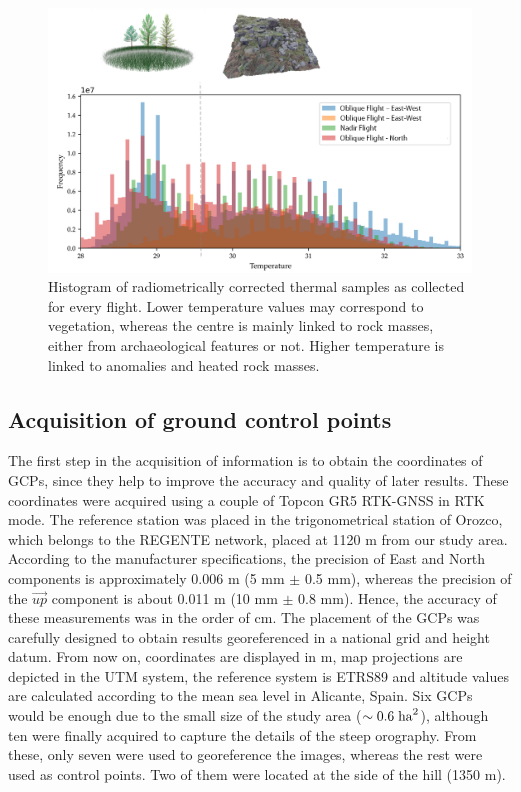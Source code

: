 \begin{figure}[ht]
    \centering
    \includegraphics[width=.85\linewidth]{figs/castle_puerta_arenas/thermal_histogram.png}
	\caption{Histogram of radiometrically corrected thermal samples as collected for every flight. Lower temperature values may correspond to vegetation, whereas the centre is mainly linked to rock masses, either from archaeological features or not. Higher temperature is linked to anomalies and heated rock masses. }
	\label{fig:temp_histogram}
\end{figure}

\subsection{Acquisition of ground control points}

The first step in the acquisition of information is to obtain the coordinates of GCPs, since they help to improve the accuracy and quality of later results. These coordinates were acquired using a couple of Topcon GR5 RTK-GNSS in RTK mode. The reference station was placed in the trigonometrical station of Orozco, which belongs to the REGENTE network, placed at 1120 \si{\meter} from our study area. According to the manufacturer specifications, the precision of East and North components is approximately 0.006 \si{\meter} (5 \si{\milli\meter} $\pm$ 0.5 \si{\milli\meter}), whereas the precision of the $\Vec{\textit{up}}$ component is about 0.011 \si{\meter} (10 \si{\milli\meter} $\pm$ 0.8 \si{\milli\meter}). Hence, the accuracy of these measurements was in the order of \si{\centi\meter}. The placement of the GCPs was carefully designed to obtain results georeferenced in a national grid and height datum. From now on, coordinates are displayed in \si{\meter}, map projections are depicted in the UTM system, the reference system is ETRS89 and altitude values are calculated according to the mean sea level in Alicante, Spain. Six GCPs would be enough due to the small size of the study area ($\sim0.6 \hspace{1mm} \si{\hectare}^2$), although ten were finally acquired to capture the details of the steep orography. From these, only seven were used to georeference the images, whereas the rest were used as control points. Two of them were located at the side of the hill (1350 \si{\meter}).

